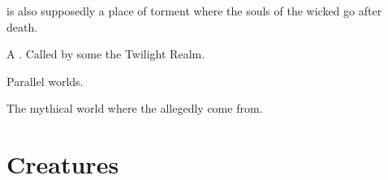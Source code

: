 \begin{gloss}
\Itzach{} is also supposedly a place of torment where the souls of the wicked go after death. 







\begin{comment}
\subsection{\Nyx}
\end{comment}
\gitem{\Nyx}
A . 
Called by some the Twilight Realm.








\begin{comment}
\subsection{Realms}
\end{comment}
Parallel worlds.







\begin{comment}
\subsection{Realm of Chaos}
\end{comment}
The mythical world where the  allegedly come from. 

\end{gloss}



















\section{Creatures}
